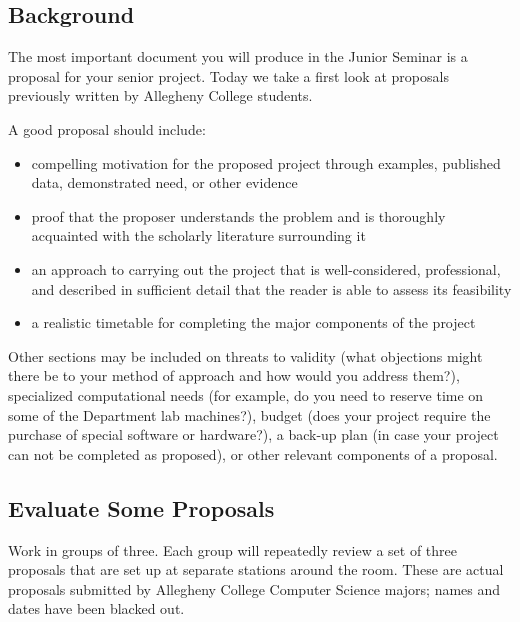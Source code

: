 
\usepackage[compact]{titlesec}




\subsection*{Background}
The most important document you will produce in the Junior Seminar is a
proposal for your senior project. Today we take a first look at
proposals previously written by Allegheny College students.

A good proposal should include:
\begin{itemize}
\item
compelling motivation for the proposed project
through examples, published data, demonstrated need, or other evidence
\item
proof that the proposer understands the problem and is 
thoroughly acquainted
with the scholarly literature surrounding it
\item
an approach to carrying out the project that is well-considered, 
professional, and described in sufficient detail that the reader is able to
assess its feasibility
\item
a realistic timetable for
completing the major components of the project
\end{itemize}
Other sections may be included on
threats to validity (what objections might there be
to your method of approach and how would you address them?), 
specialized computational needs (for example, do you need to reserve
time on some of the Department lab machines?), budget (does your project
require the purchase of special software or hardware?), a back-up plan (in
case your project can not be completed as proposed), or other relevant
components of a proposal.

\subsection*{Evaluate Some Proposals}
Work in groups of three. Each group will repeatedly review a set of
three proposals that are set up at separate stations around the room.
These are actual proposals submitted by Allegheny College Computer 
Science majors; names and dates have been blacked out.

